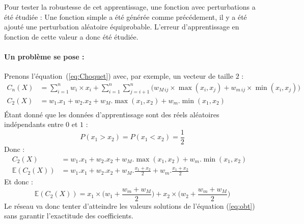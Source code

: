 Pour tester la robustesse de cet apprentissage, une fonction avec perturbations a été étudiée :
Une fonction simple a été générée comme précédement, il y a été ajouté une perturbation aléatoire équiprobable.
L’erreur d’apprentissage en fonction de cette valeur a donc été étudiée.\\


\paragraph{Un problème se pose :}
Prenons l'équation\ (\ref{eq:Choquet}) avec, par exemple, un vecteur de taille $2$ :
\begin{align*}
    C_n (X)
    & =
        \sum_{i=1}^{n}
                w_i \times x_i +
            \sum_{i=1}^{n}\sum_{j=i+1}^{n}
            \Big(
                w_{M\,ij} \times \max(x_i,x_j) + w_{m\,ij} \times \min(x_i,x_j)
            \Big)
    &\\
    C_2 (X)
    & =
        w_1.x_1 + w_2.x_2 + w_M.\max(x_1,x_2) + w_m.\min(x_1,x_2)
    &\\
\end{align*}
\'Etant donné que les données d'apprentissage sont des réels aléatoires indépendants entre $0$ et $1$ :
\begin{equation}
    \label{eq:proba}
    P(x_1 > x_2) = P(x_1 < x_2) = \frac{1}{2}
\end{equation}
Donc :
\begin{align*}
    C_2 (X)
    & =
        w_1.x_1 + w_2.x_2 + w_M.\max(x_1,x_2) + w_m.\min(x_1,x_2)
    &\\
    \mathbb{E}(C_2 (X))
    & =
        w_1.x_1 + w_2.x_2 + w_M.\frac{x_1 + x_2}{2} + w_m.\frac{x_1 + x_2}{2}
    &
\end{align*}
Et donc :
\begin{equation}
    \label{eq:obt}
    \mathbb{E}(C_2 (X)) =
        x_1 \times \Big(w_1 + \frac{w_m + w_M}{2}\Big) + x_2 \times \Big(w_2 + \frac{w_m + w_M}{2}\Big)
\end{equation}
Le réseau va donc tenter d'atteindre les valeurs solutions de l'équation
(\ref{eq:obt}) sans garantir l'exactitude des coefficients.

